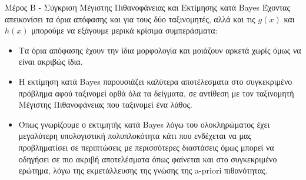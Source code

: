 \documentclass{beamer}
\begin{document}
\begin{frame}{Μέρος Β - Σύγκριση Μέγιστης Πιθανοφάνειας και Εκτίμησης κατά Bayes}
Έχοντας απεικονίσει τα όρια απόφασης και για τους δύο ταξινομητές, αλλά και τις $g(x)$ και $h(x)$ μπορούμε να εξάγουμε μερικά κρίσιμα συμπεράσματα:
\begin{itemize}
    \item Τα όρια απόφασης έχουν την ίδια μορφολογία και μοιάζουν αρκετά χωρίς όμως να είναι ακριβώς ίδια.
    \item Η εκτίμηση κατά Bayes παρουσιάζει καλύτερα αποτέλεσματα στο συγκεκριμένο πρόβλημα αφού ταξινομεί ορθά όλα τα δείγματα, σε αντίθεση με τον ταξινομητή Μέγιστης Πιθανοφάνειας που ταξινομεί ένα λάθος.
    \item Όπως γνωρίζουμε ο εκτιμητής κατά Bayes λόγω του ολοκληρώματος έχει μεγαλύτερη υπολογιστική πολυπλοκότητα κάτι που ενδέχεται να μας προβληματίσει σε περιπτώσεις με περισσότερες διαστάσεις όμως μπορεί να οδηγήσει σε πιο ακριβή αποτελέσματα όπως φαίνεται και στο συγκεκριμένο ερώτημα, λόγω της εκμετάλλευσης της γνώσης της a-priori πιθανότητας.
\end{itemize}
\end{frame}

\end{document}
